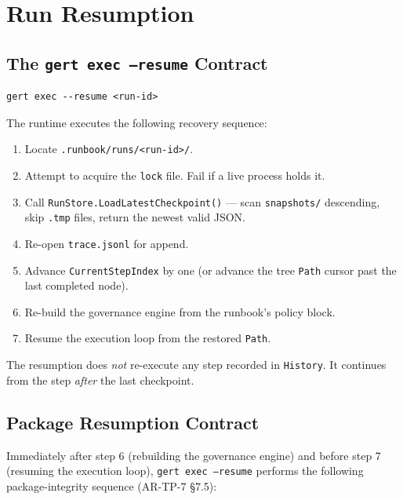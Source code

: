 \section{Run Resumption}

\subsection{The \texttt{gert exec --resume} Contract}

\begin{verbatim}
gert exec --resume <run-id>
\end{verbatim}

The runtime executes the following recovery sequence:

\begin{enumerate}
  \item Locate \texttt{.runbook/runs/<run-id>/}.
  \item Attempt to acquire the \texttt{lock} file. Fail if a live process holds it.
  \item Call \texttt{RunStore.LoadLatestCheckpoint()} — scan \texttt{snapshots/} descending, skip \texttt{.tmp} files, return the newest valid JSON.
  \item Re-open \texttt{trace.jsonl} for append.
  \item Advance \texttt{CurrentStepIndex} by one (or advance the tree \texttt{Path} cursor past the last completed node).
  \item Re-build the governance engine from the runbook's policy block.
  \item Resume the execution loop from the restored \texttt{Path}.
\end{enumerate}

The resumption does \emph{not} re-execute any step recorded in \texttt{History}. It continues from the step \emph{after} the last checkpoint.

\subsection{Package Resumption Contract}
\label{sec:package-resumption-contract}

Immediately after step 6 (rebuilding the governance engine) and before step
7 (resuming the execution loop), \texttt{gert exec --resume} performs the
following package-integrity sequence (AR-TP-7 §7.5):

